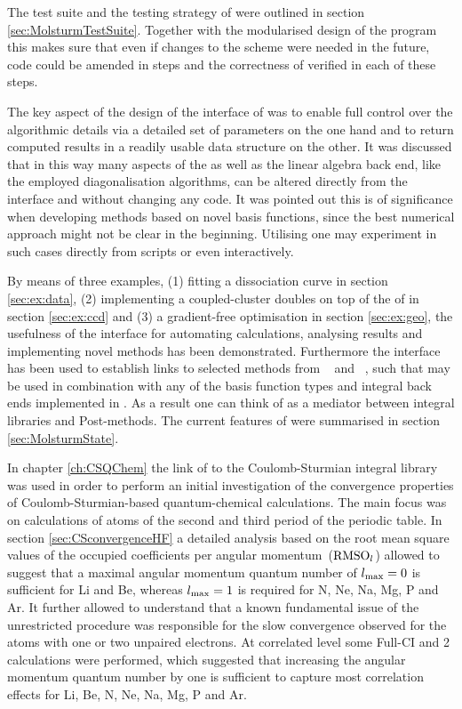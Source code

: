The test suite and the testing strategy
of \molsturm were outlined in section \ref{sec:MolsturmTestSuite}.
Together with the modularised design of the program
this makes sure that even if changes to the \SCF scheme
were needed in the future,
code could be amended in steps
and the correctness of \molsturm verified in each of these steps.

The key aspect of the design of the \python interface of \molsturm
was to enable full control over the algorithmic details
via a detailed set of parameters on the one hand and
to return computed \SCF results in a readily usable data structure on the other.
It was discussed that in this way
many aspects of the \SCF as well as the linear algebra back end,
like the employed diagonalisation algorithms,
can be altered directly from the interface and without changing any code.
It was pointed out this is
of significance when developing methods based on novel basis functions,
since the best numerical approach might not be clear in the beginning.
Utilising \molsturm one may experiment in such cases
directly from \python scripts or even interactively.

By means of three examples,
(1) fitting a  dissociation curve in section \ref{sec:ex:data},
(2) implementing a coupled-cluster doubles on top of
the \SCF of \molsturm in section \ref{sec:ex:ccd} and
(3) a gradient-free optimisation in section \ref{sec:ex:geo},
the usefulness of the \python interface
for automating calculations,
analysing results
and implementing novel methods has been demonstrated.
Furthermore the \python interface has been used to establish
links to selected methods
from \pyscf~\cite{Sun2017} and \adcman~\cite{Wormit2014},
such that may be used in combination with any of the
basis function types and integral back ends implemented in \molsturm.
As a result one can think of \molsturm as a mediator
between integral libraries and Post-\HF methods.
The current features of \molsturm
were summarised in section \ref{sec:MolsturmState}.


In chapter \ref{ch:CSQChem} the link of \molsturm
to the Coulomb-Sturmian integral library \sturmint was used
in order to perform an initial investigation
of the convergence properties of Coulomb-Sturmian-based
quantum-chemical calculations.
The main focus was on \HF calculations of atoms
of the second and third period of the periodic table.
In section \ref{sec:CSconvergenceHF}
a detailed analysis based on the root mean square values
of the occupied coefficients per angular momentum~($\text{RMSO}_l$)
allowed to suggest that
a maximal angular momentum quantum number of $l_\text{max} = 0$
is sufficient for Li and Be,
whereas $l_\text{max} = 1$ is required for N, Ne, Na, Mg, P and Ar.
It further allowed to understand that a known fundamental issue of
the unrestricted \HF procedure
was responsible for the slow convergence observed for the
atoms with one or two unpaired electrons.
At correlated level some Full-CI and {\MP}2 calculations
were performed,
which suggested that increasing the angular momentum quantum number
by one is sufficient to capture
most correlation effects for Li, Be, N, Ne, Na, Mg, P and Ar.

